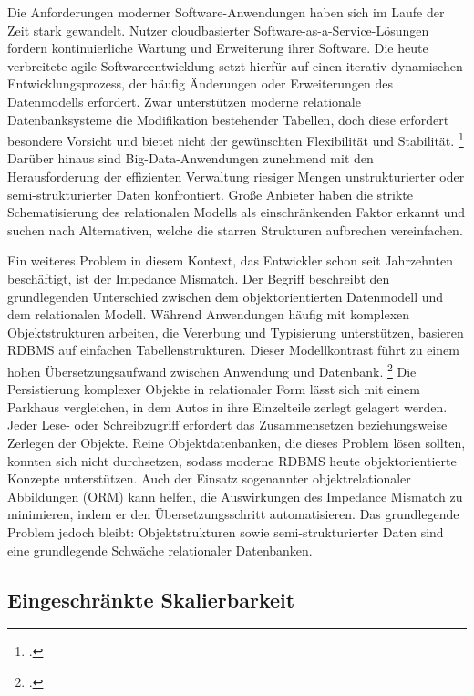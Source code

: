Die Anforderungen moderner Software-Anwendungen haben sich im Laufe der Zeit stark gewandelt. Nutzer cloudbasierter Software-as-a-Service-Lösungen fordern kontinuierliche Wartung und Erweiterung ihrer Software. Die heute verbreitete agile Softwareentwicklung setzt hierfür auf einen iterativ-dynamischen Entwicklungsprozess, der häufig  Änderungen oder Erweiterungen des Datenmodells erfordert. Zwar unterstützen moderne relationale Datenbanksysteme die Modifikation bestehender Tabellen, doch diese erfordert besondere Vorsicht und bietet nicht der gewünschten Flexibilität und Stabilität. \footcite[S. 197]{harrisonNextGenerationDatabases2015} Darüber hinaus sind Big-Data-Anwendungen zunehmend mit den Herausforderung der effizienten Verwaltung riesiger Mengen unstrukturierter oder semi-strukturierter Daten konfrontiert. Große Anbieter haben die strikte Schematisierung des relationalen Modells als einschränkenden Faktor erkannt und suchen nach Alternativen, welche die starren Strukturen aufbrechen vereinfachen.

Ein weiteres Problem in diesem Kontext, das Entwickler schon seit Jahrzehnten beschäftigt, ist der Impedance Mismatch. Der Begriff beschreibt den grundlegenden Unterschied zwischen dem objektorientierten Datenmodell und dem relationalen Modell. Während Anwendungen häufig mit komplexen Objektstrukturen arbeiten, die Vererbung und Typisierung unterstützen, basieren RDBMS auf einfachen Tabellenstrukturen. Dieser Modellkontrast führt zu einem hohen Übersetzungsaufwand zwischen Anwendung und Datenbank. \footcite{newardVietnamComputerScience2006} Die Persistierung komplexer Objekte in relationaler Form lässt sich mit einem Parkhaus vergleichen, in dem Autos in ihre Einzelteile zerlegt gelagert werden. Jeder Lese- oder Schreibzugriff erfordert das Zusammensetzen beziehungsweise Zerlegen der Objekte. Reine Objektdatenbanken, die dieses Problem lösen sollten, konnten sich nicht durchsetzen, sodass moderne RDBMS heute objektorientierte Konzepte unterstützen. Auch der Einsatz sogenannter objektrelationaler Abbildungen (ORM) kann helfen, die Auswirkungen des Impedance Mismatch zu minimieren, indem er den Übersetzungsschritt automatisieren. Das grundlegende Problem jedoch bleibt: Objektstrukturen sowie semi-strukturierter Daten sind eine grundlegende Schwäche relationaler Datenbanken.

\subsection{Eingeschränkte Skalierbarkeit}

